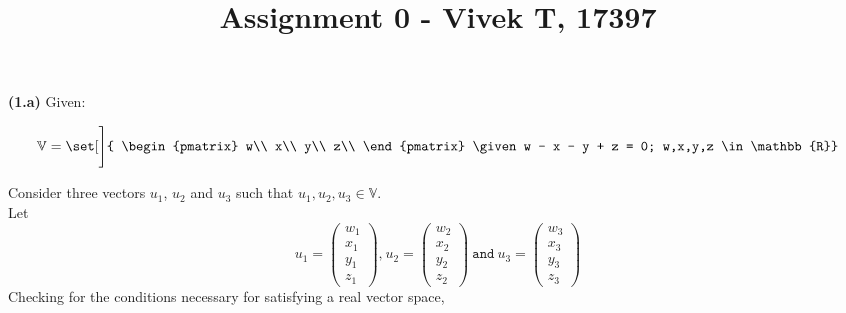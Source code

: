 \documentclass[12pt,letterpaper,fleqn]{article}
\title{Assignment 0 - Vivek T, 17397}
\theoremstyle{definition}
\begin{document}
\textbf{(1.a)} Given:

\begin{equation}
\mathbb{V} = 
\set[\Bigg]{
\begin{pmatrix}
w\\
x\\
y\\
z\\
\end{pmatrix}
\given w - x - y + z = 0; w,x,y,z \in \mathbb{R}}
\end{equation}

Consider three vectors $u_1$, $u_2$ and $u_3$ such that $u_1, u_2, u_3 \in \mathbb{V}$.\\
Let 
\begin{equation*}
u_1 =
\begin{pmatrix}
w_1\\
x_1\\
y_1\\
z_1
\end{pmatrix}\texttt{,}~
u_2 = 
\begin{pmatrix}
w_2\\
x_2\\
y_2\\
z_2
\end{pmatrix}~\texttt{and}~
u_3 = 
\begin{pmatrix}
w_3\\
x_3\\
y_3\\
z_3
\end{pmatrix}
\end{equation*}
Checking for the conditions necessary for satisfying a real vector space,
\end{document}
